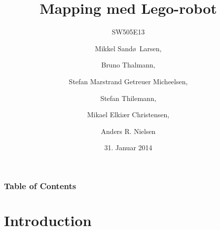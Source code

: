 \documentclass{beamer}
\title[Mapping med Lego-robot]{Mapping med Lego-robot}
\subtitle{SW505E13}
\author[SW505E13]{Mikkel Sand\o ~Larsen, \and Bruno Thalmann, \and Stefan Marstrand Getreuer Micheelsen, \and Stefan Thilemann, \and Mikael Elki\ae r Christensen, \and Anders R. Nielsen}
\institute[Aalborg University]
{
  Department of Computer Science\\
  Aalborg University}
\date[CFP 2003]{31. Januar 2014}
\begin{document}

\begin{frame}
  \titlepage
\end{frame}

\begin{frame}
    \frametitle{Table of Contents}
    \tableofcontents[sectionstyle=show/show,subsectionstyle=hide/hide/hide]
\end{frame}

\section{Introduction}


\end{document}
